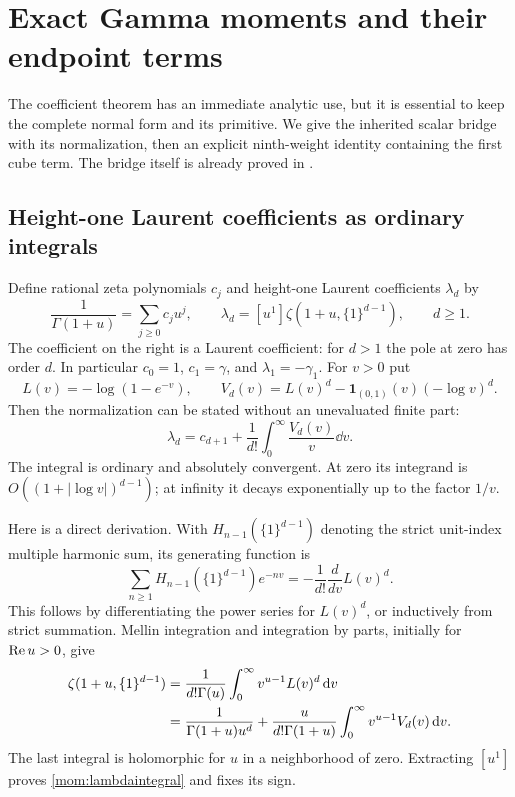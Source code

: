 \section{Exact Gamma moments and their endpoint terms}
\label{mom:section}

The coefficient theorem has an immediate analytic use, but it is
essential to keep the complete normal form and its primitive.
We give the inherited scalar bridge with its normalization, then an
explicit ninth-weight identity containing the first cube term.
The bridge itself is already proved in \cite[Section 4]{PTI}.

\subsection{Height-one Laurent coefficients as ordinary integrals}

Define rational zeta polynomials $c_j$ and height-one Laurent
coefficients $\lambda_d$ by
\begin{equation}\label{mom:clambda}
 \frac1{\Gamma(1+u)}=\sum_{j\ge0}c_ju^j,\qquad
 \lambda_d=[u^1]\zeta(1+u,\{1\}^{d-1}),\qquad d\ge1.
\end{equation}
The coefficient on the right is a Laurent coefficient: for $d>1$
the pole at zero has order $d$. In particular
$c_0=1$, $c_1=\gamma$, and $\lambda_1=-\gamma_1$.
For $v>0$ put
\[
 L(v)=-\log(1-e^{-v}),\qquad
 V_d(v)=L(v)^d-\boldsymbol1_{(0,1)}(v)(-\log v)^d.
\]
Then the normalization can be stated without an unevaluated finite
part:
\begin{equation}\label{mom:lambdaintegral}
 \boxed{\displaystyle
 \lambda_d=c_{d+1}+\frac1{d!}
                    \int_0^\infty\frac{V_d(v)}v\dd v.}
\end{equation}
The integral is ordinary and absolutely convergent. At zero its
integrand is $O((1+|\log v|)^{d-1})$; at infinity it decays
exponentially up to the factor $1/v$.

Here is a direct derivation. With $H_{n-1}(\{1\}^{d-1})$ denoting
the strict unit-index multiple harmonic sum, its generating function
is
\[
 \sum_{n\ge1}H_{n-1}(\{1\}^{d-1})e^{-nv}
 =-\frac1{d!}\frac{d}{dv}L(v)^d.
\]
This follows by differentiating the power series for $L(v)^d$,
or inductively from strict summation. Mellin integration and
integration by parts, initially for $\operatorname{Re} u>0$, give
\begin{align}\label{mom:heightmellin}
 \zeta(1+u,\{1\}^{d-1})
 &=\frac1{d!\Gamma(u)}\int_0^\infty v^{u-1}L(v)^d\,\mathrm d v\notag\\
 &=\frac1{\Gamma(1+u)u^d}
   +\frac{u}{d!\Gamma(1+u)}
          \int_0^\infty v^{u-1}V_d(v)\,\mathrm d v.
\end{align}
The last integral is holomorphic for $u$ in a neighborhood of zero.
Extracting $[u^1]$ proves \eqref{mom:lambdaintegral} and fixes its sign.

